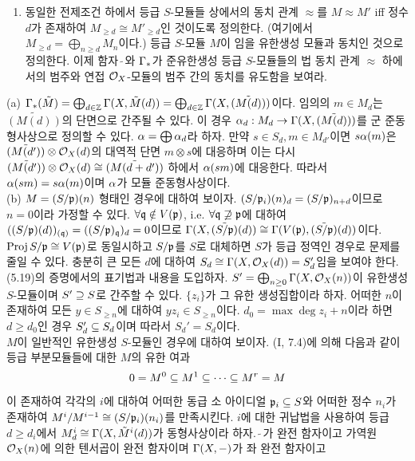 \begin{enumerate}[label=\tb{5.\arabic*.},itemindent=0mm,itemsep=4mm]
\begin{enumerate}[label=(\alph*)]
	[Hint: (5.19)의 증명의 기법들을 활용하라.]
	\item 동일한 전제조건 하에서 등급 $S$-모듈들 상에서의 동치 관계 $\approx$를 $M\approx M'$ iff
	정수 $d$가 존재하여 $M_{\ge d}\cong M'_{\ge d}$인 것이도록 정의한다. (여기에서 $M_{\ge d}=\bigoplus_{n\ge d}M_n$이다.)
	등급 $S$-모듈 $M$이 임을 유한생성 모듈과 동치인 것으로 정의한다.
	이제 함자 $\tilde{\;}$와 $\Gamma_*$가 준유한생성 등급 $S$-모듈들의 법 동치 관계 $\approx$ 하에서의 범주와
	연접 $\mathcal{O}_X$-모듈의 범주 간의 동치를 유도함을 보여라.
	\end{enumerate}
	\sol (a) $\Gamma_*(\tilde M)=\bigoplus_{d\in\mathbb Z}\Gamma(X,\tilde M(d))=\bigoplus_{d\in\mathbb Z}\Gamma(X,\tilde{(M(d))})$이다.
	임의의 $m\in M_d$는 $\tilde{(M(d))}$의 단면으로 간주될 수 있다.
	이 경우 $\alpha_d:M_d\rightarrow\Gamma(X,\tilde{(M(d))})$를 군 준동형사상으로 정의할 수 있다. $\alpha=\bigoplus\alpha_d$라 하자.
	만약 $s\in S_d,m\in M_{d'}$이면 $s\alpha(m)$은 $\tilde{(M(d'))}\otimes\mathcal{O}_X(d)$의 대역적 단면 $m\otimes s$에 대응하며
	이는 다시 $\tilde{(M(d'))}\otimes\mathcal{O}_X(d)\cong\tilde{(M(d+d'))}$ 하에서 $\alpha(sm)$에 대응한다.
	따라서 $\alpha(sm)=s\alpha(m)$이며 $\alpha$가 모듈 준동형사상이다.\\
	(b)  $M=(S/\mathfrak{p})(n)$ 형태인 경우에 대하여 보이자.
	$(S/\mathfrak{p}_i)(n)_d=(S/\mathfrak{p})_{n+d}$이므로 $n=0$이라 가정할 수 있다.
	$\forall\mathfrak{q}\notin V(\mathfrak{p})$, i.e. $\forall\mathfrak{q}\not\supseteq\mathfrak{p}$에 대하여
	$((S/\mathfrak{p})(d))_{(\mathfrak{q})}=((S/\mathfrak{p})_{\mathfrak{q}})_d=0$이므로
	$\Gamma(X,\tilde{(S/\mathfrak{p})}(d))\cong\Gamma(V(\mathfrak{p}),\tilde{(S/\mathfrak{p})}(d))$이다.
	$\operatorname{Proj} S/\mathfrak{p}\cong V(\mathfrak{p})$로 동일시하고 $S/\mathfrak{p}$를 $S$로 대체하면 $S$가 등급 정역인 경우로 문제를 줄일 수 있다.
	충분히 큰 모든 $d$에 대하여 $S_d\cong\Gamma(X,\mathcal{O}_X(d))=S_d'$임을 보여야 한다.
	(5.19)의 증명에서의 표기법과 내용을 도입하자.
	$S'=\bigoplus_{n\ge 0}\Gamma(X,\mathcal{O}_X(n))$이 유한생성 $S$-모듈이며 $S'\supseteq S$로 간주할 수 있다.
	$\{z_i\}$가 그 유한 생성집합이라 하자. 어떠한 $n$이 존재하여 모든 $y\in S_{\ge n}$에 대하여 $yz_i\in S_{\ge n}$이다.
	$d_0=\max\deg z_i+n$이라 하면 $d\ge d_0$인 경우 $S_d'\subseteq S_d$이며 따라서 $S_d'=S_d$이다.\\
	 $M$이 일반적인 유한생성 $S$-모듈인 경우에 대하여 보이자.
	(I, 7.4)에 의해 다음과 같이 등급 부분모듈들에 대한 $M$의 유한 여과
	$$0=M^0\subseteq M^1\subseteq\cdots\subseteq M^r=M$$
	이 존재하여 각각의 $i$에 대하여 어떠한 동급 소 아이디얼 $\mathfrak{p}_i\subseteq S$와 어떠한 정수 $n_i$가 존재하여
	$M^i/M^{i-1}\cong(S/\mathfrak{p}_i)(n_i)$를 만족시킨다.
	$i$에 대한 귀납법을 사용하여 등급 $d\ge d_i$에서 $M^i_d\cong\Gamma(X,\tilde M^i(d))$가 동형사상이라 하자.
	$\tilde{\;}$가 완전 함자이고 가역원 $\mathcal{O}_X(n)$에 의한 텐서곱이 완전 함자이며 $\Gamma(X,-)$가 좌 완전 함자이고

\end{enumerate}
